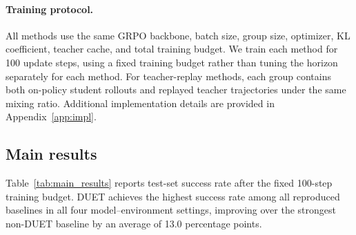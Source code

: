 \paragraph{Training protocol.}
All methods use the same GRPO backbone, batch size, group size, optimizer, KL coefficient, teacher cache, and total training budget.
We train each method for 100 update steps, using a fixed training budget rather than tuning the horizon separately for each method.
For teacher-replay methods, each group contains both on-policy student rollouts and replayed teacher trajectories under the same mixing ratio.
Additional implementation details are provided in Appendix~\ref{app:impl}.

\subsection{Main results}
\label{sec:main_results}

Table~\ref{tab:main_results} reports test-set success rate after the fixed 100-step training budget.
DUET achieves the highest success rate among all reproduced baselines in all four model--environment settings, improving over the strongest non-DUET baseline by an average of 13.0 percentage points.

\begin{table}[t]
\centering
\caption{
\textbf{Main results.}
Test-set success rate on ALFWorld and WebShop under a fixed 100-step training budget.
Best result in each column is shown in bold; the strongest non-DUET baseline is underlined.
The $\Delta$ row reports DUET's gain over the strongest non-DUET baseline.
}
\label{tab:main_results}
\end{table}


